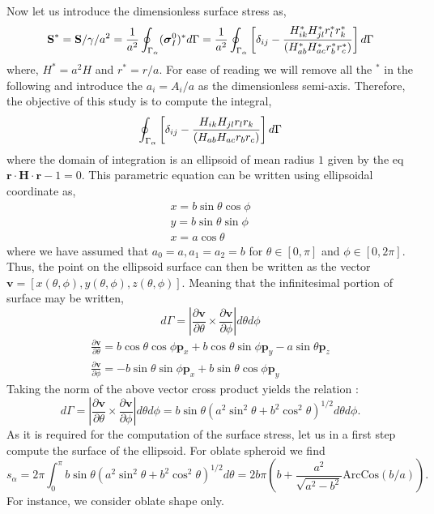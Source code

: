 Now let us introduce the dimensionless surface stress as, 
\begin{equation*}
    \textbf{S}^* 
    = \textbf{S} / \gamma /a^2
    = \frac{1}{a^2}\oint_{\Gamma_{\alpha}} (\bm\sigma_I^0)^* d\Gamma
    = \frac{1}{a^2}\oint_{\Gamma_{\alpha}}  \left[\delta_{ij} - \frac{H_{ik}^*H_{jl}^*r_l^*r_k^*}{(H_{ab}^*H_{ac}^*r_b^*r_c^*)} \right] d\Gamma
\end{equation*}
where, $H^* = a^2 H$ and $r^* = r/a$.
For ease of reading we will remove all the $^*$ in the following and introduce the $a_i = A_i/a$ as the dimensionless semi-axis.
Therefore, the objective of this study is to compute the integral, 
\begin{equation*}
    \oint_{\Gamma_{\alpha}} \left[\delta_{ij} -\frac{H_{ik}H_{jl}r_lr_k}{(H_{ab}H_{ac}r_br_c)}\right]  d\Gamma
\end{equation*}
where the domain of integration is an ellipsoid of mean radius $1$ given by the eq $\textbf{r}\cdot \textbf{H}\cdot \textbf{r} -1 =0$. 
This parametric equation can be written using ellipsoidal coordinate as,
\begin{align*}
    x = b \sin\theta \cos\phi\\
    y = b \sin\theta \sin\phi\\
    x = a \cos\theta 
\end{align*}
where we have assumed that $a_0 = a, a_1=a_2=b$ for $\theta \in [0,\pi]$ and $\phi \in [0,2\pi]$.
Thus, the point on the ellipsoid surface can then be written as the vector $\textbf{v} = [x(\theta,\phi),y(\theta,\phi),z(\theta,\phi)]$. 
Meaning that the infinitesimal portion of surface may be written, 
\begin{equation*}
    d\Gamma = \left|\frac{\partial \textbf{v}}{\partial \theta}\times \frac{\partial \textbf{v}}{\partial \phi}\right| d\theta d\phi
\end{equation*}
\begin{align*}
    \frac{\partial \textbf{v}}{\partial \theta}
    = 
    b \cos \theta \cos \phi \textbf{p}_x
    + b \cos \theta \sin \phi\textbf{p}_y
    - a \sin \theta \textbf{p}_z
    \\
    \frac{\partial \textbf{v}}{\partial \phi}
    = 
    - b \sin \theta \sin \phi \textbf{p}_x
    + b \sin \theta \cos \phi\textbf{p}_y
\end{align*}
Taking the norm of the above vector cross product yields the relation : 
\begin{equation*}
    d\Gamma = \left|\frac{\partial \textbf{v}}{\partial \theta} 
    \times 
    \frac{\partial \textbf{v}}{\partial \phi} \right| d\theta d\phi 
    = b \sin\theta (a^2\sin^2\theta+ b^2 \cos^2\theta)^{1/2}d\theta d\phi. 
\end{equation*}
As it is required for the computation of the surface stress, let us in a first step compute the surface of the ellipsoid.
For oblate spheroid we find
\begin{equation}
    s_\alpha
    = 2\pi 
    \int_0^\pi 
    b \sin\theta (a^2\sin^2\theta+ b^2 \cos^2\theta)^{1/2} d\theta 
    =
    2b\pi \left( b + \frac{a^2}{\sqrt{a^2-b^2}}\text{ArcCos}(b/a)\right). 
    \label{eq:surfcae}
\end{equation} 
For instance, we consider oblate shape only. 

